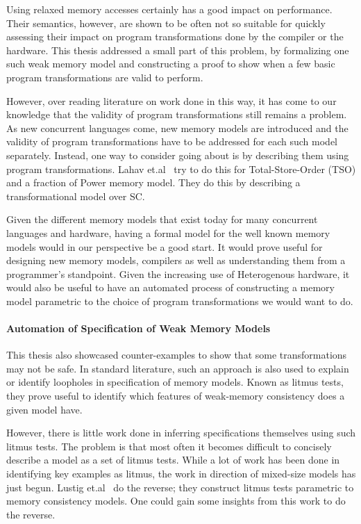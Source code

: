         Using relaxed memory accesses certainly has a good impact on performance. 
        Their semantics, however, are shown to be often not so suitable for quickly assessing their impact on program transformations done by the compiler or the hardware. 
        This thesis addressed a small part of this problem, by formalizing one such weak memory model and constructing a proof to show when a few basic program transformations are valid to perform. 

        However, over reading literature on work done in this way, it has come to our knowledge that the validity of program transformations still remains a problem. 
        As new concurrent languages come, new memory models are introduced and the validity of program transformations have to be addressed for each such model separately. 
        Instead, one way to consider going about is by describing them using program transformations. 
        Lahav et.al~\cite{Lahav2} try to do this for Total-Store-Order (TSO) and a fraction of Power memory model. 
        They do this by describing a transformational model over SC. 
        
        Given the different memory models that exist today for many concurrent languages and hardware, having a formal model for the well known memory models would in our perspective be a good start. 
        It would prove useful for designing new memory models, compilers as well as understanding them from a programmer's standpoint. 
        Given the increasing use of Heterogenous hardware, it would also be useful to have an automated process of constructing a memory model parametric to the choice of program transformations we would want to do.

    \paragraph{Automation of Specification of Weak Memory Models}

        This thesis also showcased counter-examples to show that some transformations may not be safe. 
        In standard literature, such an approach is also used to explain or identify loopholes in specification of memory models. 
        Known as litmus tests, they prove useful to identify which features of weak-memory consistency does a given model have. 

        However, there is little work done in inferring specifications themselves using such litmus tests. 
        The problem is that most often it becomes difficult to concisely describe a model as a set of litmus tests.
        While a lot of work has been done in identifying key examples as litmus, the work in direction of mixed-size models has just begun. 
        Lustig et.al~\cite{Lustig} do the reverse; they construct litmus tests parametric to memory consistency models. 
        One could gain some insights from this work to do the reverse. 
